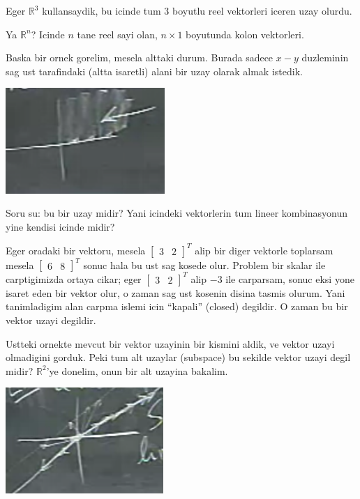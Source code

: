 \documentclass[12pt,fleqn]{article}\usepackage{../common}
\begin{document}
Eger $\mathbb{R}^3$ kullansaydik, bu icinde tum 3 boyutlu reel vektorleri
iceren uzay olurdu. 

Ya $\mathbb{R}^n$? Icinde $n$ tane reel sayi olan, $n \times 1$ boyutunda
kolon vektorleri. 

Baska bir ornek gorelim, mesela alttaki durum. Burada sadece $x-y$
duzleminin sag ust tarafindaki (altta isaretli) alani bir uzay olarak almak
istedik. 

\includegraphics[height=4cm]{5_02.png}

Soru su: bu bir uzay midir? Yani icindeki vektorlerin tum lineer
kombinasyonun yine kendisi icinde midir? 

Eger oradaki bir vektoru, mesela $\left[\begin{array}{rr}3 &
    2\end{array}\right]^T$ alip bir diger vektorle toplarsam mesela
$\left[\begin{array}{rr}6 & 8\end{array}\right]^T$ sonuc hala bu ust sag kosede olur. Problem bir skalar ile carptigimizda ortaya cikar; eger
$\left[\begin{array}{rr}3 & 2\end{array}\right]^T$ alip $-3$ ile carparsam, sonuc eksi yone isaret eden bir vektor olur, o zaman sag ust kosenin disina
tasmis olurum. Yani tanimladigim alan carpma islemi icin ``kapali'' (closed) degildir.
O zaman bu bir vektor uzayi degildir. 

Ustteki ornekte mevcut bir vektor uzayinin bir kismini aldik, ve vektor
uzayi olmadigini gorduk. Peki tum alt uzaylar (subspace) bu sekilde vektor
uzayi degil midir? $\mathbb{R}^2$'ye donelim, onun bir alt uzayina
bakalim. 

\includegraphics[height=4cm]{5_03.png}
\end{document}
